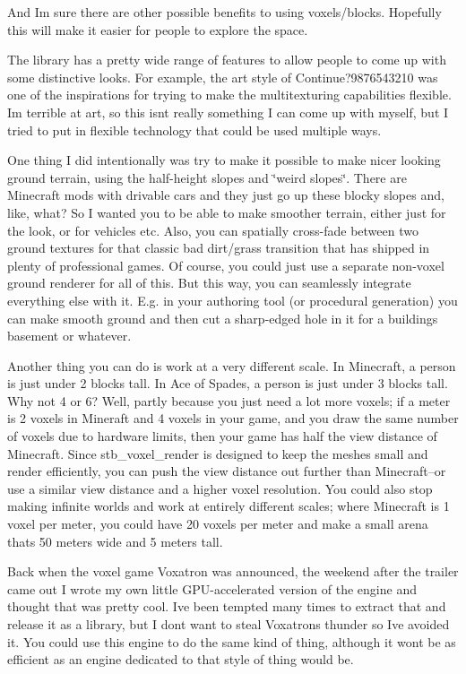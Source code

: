 And I\textquotesingle{}m sure there are other possible benefits to using voxels/blocks. Hopefully this will make it easier for people to explore the space.

The library has a pretty wide range of features to allow people to come up with some distinctive looks. For example, the art style of Continue?9876543210 was one of the inspirations for trying to make the multitexturing capabilities flexible. I\textquotesingle{}m terrible at art, so this isn\textquotesingle{}t really something I can come up with myself, but I tried to put in flexible technology that could be used multiple ways.

One thing I did intentionally was try to make it possible to make nicer looking ground terrain, using the half-\/height slopes and \char`\"{}weird slopes\char`\"{}. There are Minecraft mods with drivable cars and they just go up these blocky slopes and, like, what? So I wanted you to be able to make smoother terrain, either just for the look, or for vehicles etc. Also, you can spatially cross-\/fade between two ground textures for that classic bad dirt/grass transition that has shipped in plenty of professional games. Of course, you could just use a separate non-\/voxel ground renderer for all of this. But this way, you can seamlessly integrate everything else with it. E.\+g. in your authoring tool (or procedural generation) you can make smooth ground and then cut a sharp-\/edged hole in it for a building\textquotesingle{}s basement or whatever.

Another thing you can do is work at a very different scale. In Minecraft, a person is just under 2 blocks tall. In Ace of Spades, a person is just under 3 blocks tall. Why not 4 or 6? Well, partly because you just need a lot more voxels; if a meter is 2 voxels in Mineraft and 4 voxels in your game, and you draw the same number of voxels due to hardware limits, then your game has half the view distance of Minecraft. Since stb\+\_\+voxel\+\_\+render is designed to keep the meshes small and render efficiently, you can push the view distance out further than Minecraft--or use a similar view distance and a higher voxel resolution. You could also stop making infinite worlds and work at entirely different scales; where Minecraft is 1 voxel per meter, you could have 20 voxels per meter and make a small arena that\textquotesingle{}s 50 meters wide and 5 meters tall.

Back when the voxel game Voxatron was announced, the weekend after the trailer came out I wrote my own little G\+P\+U-\/accelerated version of the engine and thought that was pretty cool. I\textquotesingle{}ve been tempted many times to extract that and release it as a library, but I don\textquotesingle{}t want to steal Voxatron\textquotesingle{}s thunder so I\textquotesingle{}ve avoided it. You could use this engine to do the same kind of thing, although it won\textquotesingle{}t be as efficient as an engine dedicated to that style of thing would be.

